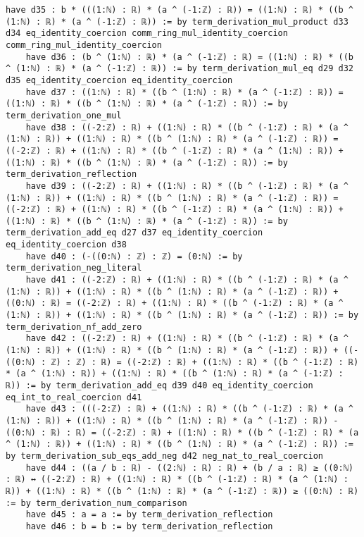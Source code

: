 \documentclass{article}
\begin{document}
\begin{tcolorbox}[colback=white!10, width=\linewidth]
\begin{lstlisting}[language=Lean4]
    have d35 : b * (((1:ℕ) : ℝ) * (a ^ (-1:ℤ) : ℝ)) = ((1:ℕ) : ℝ) * ((b ^ (1:ℕ) : ℝ) * (a ^ (-1:ℤ) : ℝ)) := by term_derivation_mul_product d33 d34 eq_identity_coercion comm_ring_mul_identity_coercion comm_ring_mul_identity_coercion
    have d36 : (b ^ (1:ℕ) : ℝ) * (a ^ (-1:ℤ) : ℝ) = ((1:ℕ) : ℝ) * ((b ^ (1:ℕ) : ℝ) * (a ^ (-1:ℤ) : ℝ)) := by term_derivation_mul_eq d29 d32 d35 eq_identity_coercion eq_identity_coercion
    have d37 : ((1:ℕ) : ℝ) * ((b ^ (1:ℕ) : ℝ) * (a ^ (-1:ℤ) : ℝ)) = ((1:ℕ) : ℝ) * ((b ^ (1:ℕ) : ℝ) * (a ^ (-1:ℤ) : ℝ)) := by term_derivation_one_mul
    have d38 : ((-2:ℤ) : ℝ) + ((1:ℕ) : ℝ) * ((b ^ (-1:ℤ) : ℝ) * (a ^ (1:ℕ) : ℝ)) + ((1:ℕ) : ℝ) * ((b ^ (1:ℕ) : ℝ) * (a ^ (-1:ℤ) : ℝ)) = ((-2:ℤ) : ℝ) + ((1:ℕ) : ℝ) * ((b ^ (-1:ℤ) : ℝ) * (a ^ (1:ℕ) : ℝ)) + ((1:ℕ) : ℝ) * ((b ^ (1:ℕ) : ℝ) * (a ^ (-1:ℤ) : ℝ)) := by term_derivation_reflection
    have d39 : ((-2:ℤ) : ℝ) + ((1:ℕ) : ℝ) * ((b ^ (-1:ℤ) : ℝ) * (a ^ (1:ℕ) : ℝ)) + ((1:ℕ) : ℝ) * ((b ^ (1:ℕ) : ℝ) * (a ^ (-1:ℤ) : ℝ)) = ((-2:ℤ) : ℝ) + ((1:ℕ) : ℝ) * ((b ^ (-1:ℤ) : ℝ) * (a ^ (1:ℕ) : ℝ)) + ((1:ℕ) : ℝ) * ((b ^ (1:ℕ) : ℝ) * (a ^ (-1:ℤ) : ℝ)) := by term_derivation_add_eq d27 d37 eq_identity_coercion eq_identity_coercion d38
    have d40 : (-((0:ℕ) : ℤ) : ℤ) = (0:ℕ) := by term_derivation_neg_literal
    have d41 : ((-2:ℤ) : ℝ) + ((1:ℕ) : ℝ) * ((b ^ (-1:ℤ) : ℝ) * (a ^ (1:ℕ) : ℝ)) + ((1:ℕ) : ℝ) * ((b ^ (1:ℕ) : ℝ) * (a ^ (-1:ℤ) : ℝ)) + ((0:ℕ) : ℝ) = ((-2:ℤ) : ℝ) + ((1:ℕ) : ℝ) * ((b ^ (-1:ℤ) : ℝ) * (a ^ (1:ℕ) : ℝ)) + ((1:ℕ) : ℝ) * ((b ^ (1:ℕ) : ℝ) * (a ^ (-1:ℤ) : ℝ)) := by term_derivation_nf_add_zero
    have d42 : ((-2:ℤ) : ℝ) + ((1:ℕ) : ℝ) * ((b ^ (-1:ℤ) : ℝ) * (a ^ (1:ℕ) : ℝ)) + ((1:ℕ) : ℝ) * ((b ^ (1:ℕ) : ℝ) * (a ^ (-1:ℤ) : ℝ)) + ((-((0:ℕ) : ℤ) : ℤ) : ℝ) = ((-2:ℤ) : ℝ) + ((1:ℕ) : ℝ) * ((b ^ (-1:ℤ) : ℝ) * (a ^ (1:ℕ) : ℝ)) + ((1:ℕ) : ℝ) * ((b ^ (1:ℕ) : ℝ) * (a ^ (-1:ℤ) : ℝ)) := by term_derivation_add_eq d39 d40 eq_identity_coercion eq_int_to_real_coercion d41
    have d43 : (((-2:ℤ) : ℝ) + ((1:ℕ) : ℝ) * ((b ^ (-1:ℤ) : ℝ) * (a ^ (1:ℕ) : ℝ)) + ((1:ℕ) : ℝ) * ((b ^ (1:ℕ) : ℝ) * (a ^ (-1:ℤ) : ℝ)) - ((0:ℕ) : ℝ) : ℝ) = ((-2:ℤ) : ℝ) + ((1:ℕ) : ℝ) * ((b ^ (-1:ℤ) : ℝ) * (a ^ (1:ℕ) : ℝ)) + ((1:ℕ) : ℝ) * ((b ^ (1:ℕ) : ℝ) * (a ^ (-1:ℤ) : ℝ)) := by term_derivation_sub_eqs_add_neg d42 neg_nat_to_real_coercion
    have d44 : ((a / b : ℝ) - ((2:ℕ) : ℝ) : ℝ) + (b / a : ℝ) ≥ ((0:ℕ) : ℝ) ↔ ((-2:ℤ) : ℝ) + ((1:ℕ) : ℝ) * ((b ^ (-1:ℤ) : ℝ) * (a ^ (1:ℕ) : ℝ)) + ((1:ℕ) : ℝ) * ((b ^ (1:ℕ) : ℝ) * (a ^ (-1:ℤ) : ℝ)) ≥ ((0:ℕ) : ℝ) := by term_derivation_num_comparison
    have d45 : a = a := by term_derivation_reflection
    have d46 : b = b := by term_derivation_reflection

\end{lstlisting}
\end{tcolorbox}
\end{document}
